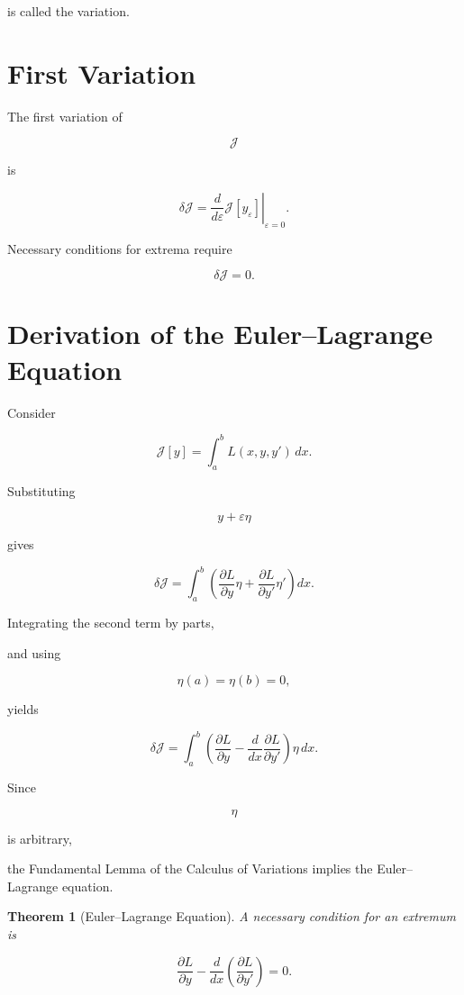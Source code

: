 \documentclass[11pt,fleqn]{book}
\numberwithin{equation}{chapter}
\theoremstyle{plain}
\newtheorem{theorem}{Theorem}[chapter]
\theoremstyle{definition}
\theoremstyle{remark}
\begin{document}
is called the variation.


\section{First Variation}

The first variation of

\[
\mathcal J
\]

is

\[
\boxed{
\delta\mathcal J
=
\left.
\frac{d}{d\varepsilon}
\mathcal J[y_\varepsilon]
\right|_{\varepsilon=0}.
}
\]

Necessary conditions for extrema require

\[
\delta\mathcal J=0.
\]


\section{Derivation of the Euler--Lagrange Equation}

Consider

\[
\mathcal J[y]
=
\int_a^b
L(x,y,y')
\,dx.
\]

Substituting

\[
y+\varepsilon\eta
\]

gives

\[
\delta\mathcal J
=
\int_a^b
\left(
\frac{\partial L}{\partial y}\eta
+
\frac{\partial L}{\partial y'}
\eta'
\right)
dx.
\]

Integrating the second term by parts,

and using

\[
\eta(a)
=
\eta(b)
=
0,
\]

yields

\[
\delta\mathcal J
=
\int_a^b
\left(
\frac{\partial L}{\partial y}
-
\frac{d}{dx}
\frac{\partial L}{\partial y'}
\right)
\eta
\,dx.
\]

Since

\[
\eta
\]

is arbitrary,

the Fundamental Lemma of the Calculus of Variations implies the
Euler--Lagrange equation.


\begin{theorem}[Euler--Lagrange Equation]

A necessary condition for an extremum is

\[
\boxed{
\frac{\partial L}{\partial y}
-
\frac{d}{dx}
\left(
\frac{\partial L}{\partial y'}
\right)
=
0.
}
\]

\end{theorem}
\end{document}
